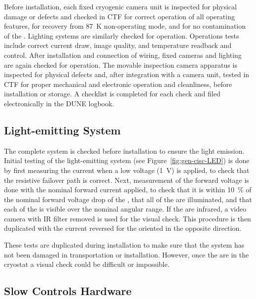 Before installation, each fixed cryogenic camera unit is inspected for physical damage or defects and checked in CTF 
 for correct operation of all operating features, for recovery from \SI{87}{K} non-operating mode, and for no contamination of the \lar{}. Lighting systems are similarly checked for operation. Operations tests include correct current draw, image quality, and temperature readback and control. After installation and connection of wiring, fixed cameras and lighting are again  checked for operation. The movable inspection camera apparatus is inspected for physical defects and, after integration with a camera unit, tested in CTF for proper mechanical and electronic operation and cleanliness, before installation or storage. A checklist is completed for each  check and filed electronically in the DUNE logbook. 

\subsection{Light-emitting System}
\label{sec:fdgen-slow-cryo-qc-les}

The complete system is checked before installation to ensure the light emission. 
Initial testing of the light-emitting system (see Figure~\ref{fig:gen-cisc-LED}) is done by first
measuring the current when a low voltage (\SI{1}{V}) is applied, to check
that the resistive  failover path is correct. Next, measurement
of the forward voltage is done with the nominal forward current applied, to
check that it is within \SI{10}{\%} of the nominal forward voltage drop of
the , that all of the  are illuminated, and that each of the
 is visible over the nominal angular range. If the  are
infrared, a video camera with IR filter removed is used for the
visual check. This procedure is then duplicated with the current
reversed for the  oriented in the opposite direction.  

These tests are duplicated during
installation to make sure that the system has
not been damaged in transportation or installation. However, once
the  are in the cryostat a visual check could be difficult or impossible.


\subsection{Slow Controls Hardware}
\label{sec:fdgen-slow-cryo-qc-sc-hard}

